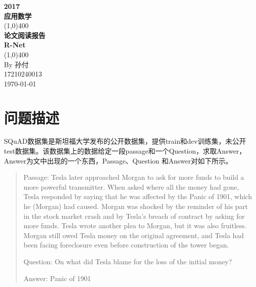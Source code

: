\documentclass[UTF8]{article}
\begin{document}
\begin{titlepage}
    \begin{center}
        \vspace*{1cm}
        \Large{\textbf{2017}}\\
        \Large{\textbf{应用数学}}\\
        \vfill
        \line(1,0){400}\\[1mm]
        \huge{\textbf{论文阅读报告}}\\
        \Large{\textbf{R-Net}}\\
        \line(1,0){400}\\
        \vfill
        By 孙付\\
        17210240013\\
        \today\\
    \end{center}
\end{titlepage}
\tableofcontents
\clearpage

\section{问题描述}
SQuAD数据集是斯坦福大学发布的公开数据集，提供train和dev训练集，未公开test数据集。该数据集上的数据给定一段passage和一个Question，求取Answer，Answer为文中出现的一个东西，Passage、Question 和Answer对如下所示。
\begin{quotation}
\noindent Passage: Tesla later approached Morgan to ask for more funds to build a more powerful transmitter.  When asked where all the money had gone, Tesla responded by saying that he was affected by the Panic of 1901, which he (Morgan) had caused. Morgan was shocked by the reminder of his part in the stock market crash and by Tesla’s breach of contract by asking for more funds. Tesla wrote another plea to Morgan, but it was also fruitless. Morgan still owed Tesla money on the original agreement, and Tesla had been facing foreclosure even before construction of the tower began.

\noindent Question: On what did Tesla blame for the loss of the initial money?

\noindent Answer: Panic of 1901
\end{quotation}
\end{document}
